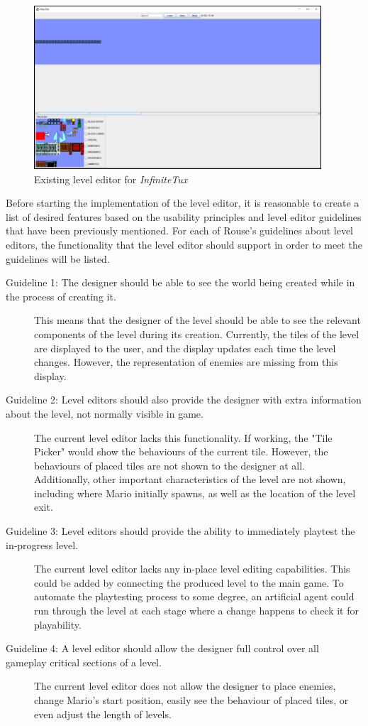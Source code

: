 \begin{figure}[ht]
    \centering
    \includegraphics[width=0.8\linewidth]{img/fig11-ift-editor.png}
    \caption{Existing level editor for \emph{InfiniteTux}}
    \label{fig:ift-editor}
\end{figure}

Before starting the implementation of the level editor, it is reasonable to create a list
of desired features based on the usability principles and level editor guidelines that have
been previously mentioned. For each of Rouse's guidelines about level editors, the
functionality that the level editor should support in order to meet the guidelines will be
listed.

\begin{description}
    \item [Guideline 1: The designer should be able to see the world being created while in the process of creating it.] This means that the designer of the level should be able to see the relevant components of the level during its creation. Currently, the tiles of the level are displayed to the user, and the display updates each time the level changes. However, the representation of enemies are missing from this display.
    \item [Guideline 2: Level editors should also provide the designer with extra information about the level, not normally visible in game.] The current level editor lacks this functionality. If working, the "Tile Picker" would show the behaviours of the current tile. However, the behaviours of placed tiles are not shown to the designer at all. Additionally, other important characteristics of the level are not shown, including where Mario initially spawns, as well as the location of the level exit.
    \item [Guideline 3: Level editors should provide the ability to immediately playtest the in-progress level.] The current level editor lacks any in-place level editing capabilities. This could be added by connecting the produced level to the main game. To automate the playtesting process to some degree, an artificial agent could run through the level at each stage where a change happens to check it for playability.
    \item [Guideline 4: A level editor should allow the designer full control over all gameplay critical sections of a level.] The current level editor does not allow the designer to place enemies, change Mario's start position, easily see the behaviour of placed tiles, or even adjust the length of levels.
\end{description}

